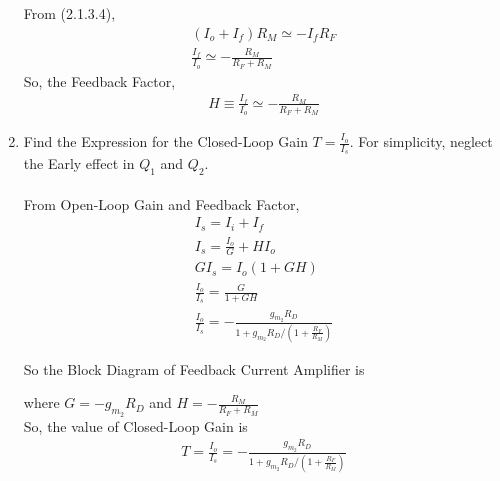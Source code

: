 \begin{enumerate}[label=\thesubsection.\arabic*.,ref=\thesubsection.\theenumi]
From (2.1.3.4),
\begin{align}
(I_{o} + I_{f})R_{M} \simeq -I_{f}R_{F}\\
\frac{I_{f}}{I_{o}} \simeq -\frac{R_{M}}{R_{F}+R_{M}}
\end{align}
So, the Feedback Factor,
\begin{align}
H \equiv \frac{I_{f}}{I_{o}} \simeq-\frac{R_{M}}{R_{F}+R_{M}}
\end{align}
\item Find the Expression for the Closed-Loop Gain $T=\frac{I_{o}}{I_{s}}$. For simplicity, neglect the Early effect in $Q_{1}$ and $Q_{2}$.\\
\solution \\
From Open-Loop Gain and Feedback Factor,
\begin{align}
I_{s} = I_{i} + I_{f}\\
I_{s} = \frac{I_{o}}{G} + H I_{o}\\
GI_{s} = I_{o}(1+GH)\\
\frac{I_{o}}{I_{s}} = \frac{G}{1+GH}\\
\frac{I_{o}}{I_{s}}=-\frac{g_{m_{2}} R_{D}}{1+g_{m_{2}} R_{D} /\left(1+\frac{R_{F}}{R_{M}}\right)}
\end{align}

So the Block Diagram of Feedback Current Amplifier is
\begin{figure}[ht!]
	\begin{center}
		\resizebox{\columnwidth}{!}{}
	\end{center}
	\caption{}
	\label{fig:Control_System}
\end{figure}

where $G = -g_{m_{2}} R_{D}$ and $H = -\frac{R_{M}}{R_{F}+R_{M}}$\\

So, the value of Closed-Loop Gain is
\begin{align}
T = \frac{I_{o}}{I_{s}}=-\frac{g_{m_{2}} R_{D}}{1+g_{m_{2}} R_{D} /\left(1+\frac{R_{F}}{R_{M}}\right)}
\end{align}

\end{enumerate}
